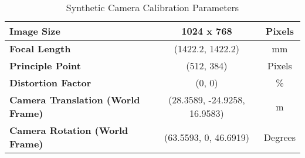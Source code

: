 \begin{table}[H]
\centering
\begin{tabular}{|l|c|c|}
\hline
\textbf{Image Size}                       & 1024 x 768                   & Pixels  \\ \hline
\textbf{Focal Length}                     & (1422.2, 1422.2)             & mm      \\ \hline
\textbf{Principle Point}                  & (512, 384)                   & Pixels  \\ \hline
\textbf{Distortion Factor}                & (0, 0)                       & \%      \\ \hline
\textbf{Camera Translation (World Frame)} & (28.3589, -24.9258, 16.9583) & m       \\ \hline
\textbf{Camera Rotation (World Frame)}    & (63.5593, 0, 46.6919)        & Degrees \\ \hline
\end{tabular}
\caption{Synthetic Camera Calibration Parameters}
\end{table}